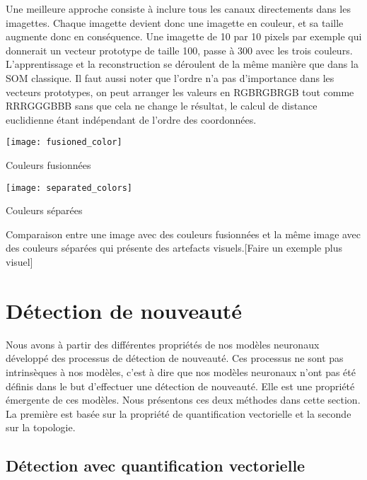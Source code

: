 	Une meilleure approche consiste à inclure tous les canaux directements dans les imagettes. Chaque imagette devient donc une imagette en couleur, et sa taille augmente donc en conséquence. Une imagette de 10 par 10 pixels par exemple qui donnerait un vecteur prototype de taille 100, passe à 300 avec les trois couleurs. L'apprentissage et la reconstruction se déroulent de la même manière que dans la SOM classique. Il faut aussi noter que l'ordre n'a pas d'importance dans les vecteurs prototypes, on peut arranger les valeurs en RGBRGBRGB tout comme RRRGGGBBB sans que cela ne change le résultat, le calcul de distance euclidienne étant indépendant de l'ordre des coordonnées.

	\begin{figureth}
		\begin{subfigureth}{0.48\textwidth}
			\texttt{[image: fusioned\_color]}\caption{Couleurs fusionnées}	
		\end{subfigureth}
		\begin{subfigureth}{0.48\textwidth}
			\texttt{[image: separated\_colors]}\caption{Couleurs séparées}	
		\end{subfigureth}
		\caption[Représentation d'une image]{Comparaison entre une image avec des couleurs fusionnées et la même image avec des couleurs séparées qui présente des artefacts visuels.[Faire un exemple plus visuel]}\label{fig:img:rep}
	\end{figureth}

	\newpage
	\section{Détection de nouveauté}

	Nous avons à partir des différentes propriétés de nos modèles neuronaux développé des processus de détection de nouveauté. Ces processus ne sont pas intrinsèques à nos modèles, c'est à dire que nos modèles neuronaux n'ont pas été définis dans le but d'effectuer une détection de nouveauté. Elle est une propriété émergente de ces modèles. Nous présentons ces deux méthodes dans cette section. La première est basée sur la propriété de quantification vectorielle et la seconde sur la topologie.

	\subsection{Détection avec quantification vectorielle}

